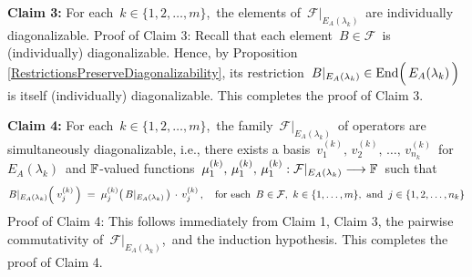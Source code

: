 \begin{enumerate}
    \vskip 0.3cm
    \noindent
    \textbf{Claim 3:}\;
    For each \,$k \in \{1,2,\ldots,m\}$,\,
    the elements of \,$\mathcal{F}\vert_{E_{A}(\lambda_{k})}$\, are individually diagonalizable.
    \vskip -0.01cm
    \noindent
    Proof of Claim 3:\;
    Recall that each element \,$B \in \mathcal{F}$\, is (individually) diagonalizable.
    Hence, by Proposition \ref{RestrictionsPreserveDiagonalizability}, its restriction
    \,$B\vert_{E_{A}(\lambda_{k})} \in \End\!\left(\,\overset{{\color{white}.}}{E_{A}(\lambda_{k})}\,\right)$\,
    is itself (individually) diagonalizable.
    This completes the proof of Claim 3.

    \vskip 0.3cm
    \noindent
    \textbf{Claim 4:}\;
    For each \,$k \in \{1,2,\ldots,m\}$,\,
    the family \,$\mathcal{F}\vert_{E_{A}(\lambda_{k})}$\, of operators
    are simultaneously diagonalizable, i.e.,
    there exists a basis
    \,$v^{(k)}_{1},\, v^{(k)}_{2},\, \ldots,\, v^{(k)}_{n_{k}}$\,
    for \,$E_{A}(\lambda_{k})$\, and $\mathbb{F}$-valued functions
    \,$
    \mu^{(k)}_{1},\, \mu^{(k)}_{1},\, \mu^{(k)}_{1} :
        \mathcal{F}\vert_{E_{A}(\lambda_{k})} \longrightarrow \mathbb{F}
    $\,
    such that
    \begin{equation*}
    B\vert_{E_{A}(\lambda_{k})}\!\left(\;v^{(k)}_{j}\,\right)
    \; = \;
        \mu^{(k)}_{j}\!\left(\,B\vert_{E_{A}(\lambda_{k})}\,\right) \,\cdot\, v^{(k)}_{j}\,,
    \quad
    \textnormal{for each \,$B \in \mathcal{F}$,\, $k \in \{1,\ldots,m\}$,\, and \,$j \in \{1, 2, \ldots, n_{k}\}$}
    \end{equation*}
    \vskip -0.01cm
    \noindent
    Proof of Claim 4:\;
    This follows immediately from Claim 1, Claim 3,
    the pairwise commutativity of \,$\mathcal{F}\vert_{E_{A}(\lambda_{k})}$,\, and
    the induction hypothesis.
    This completes the proof of Claim 4.


\end{enumerate}
